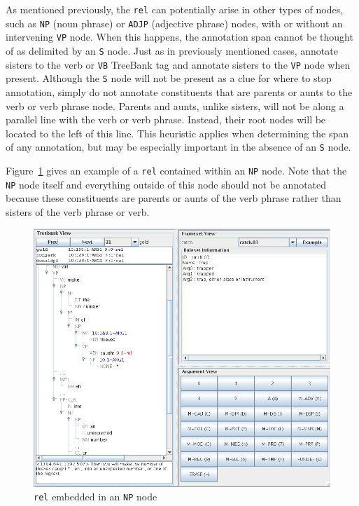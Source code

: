 \documentclass[11pt]{report}
\begin{document}
As mentioned previously, the \texttt{rel} can potentially arise in other types of nodes, such as \texttt{NP} (noun phrase) or \texttt{ADJP} (adjective phrase) nodes, with or without an intervening \texttt{VP} node.  When this happens, the annotation span cannot be thought of as delimited by an \texttt{S} node.  Just as in previously mentioned cases, annotate sisters to the verb or \texttt{VB} TreeBank tag and annotate sisters to the \texttt{VP} node when present.  Although the \texttt{S} node will not be present as a clue for where to stop annotation, simply do not annotate constituents that are parents or aunts to the verb or verb phrase node.  Parents and aunts, unlike sisters, will not be along a parallel line with the verb or verb phrase.  Instead, their root nodes will be located to the left of this line.  This heuristic applies when determining the span of any annotation, but may be especially important in the absence of an \texttt{S} node.  

Figure~\ref{fig: NPRel} gives an example of a \texttt{rel} contained within an \texttt{NP} node.  Note that the \texttt{NP} node itself and everything outside of this node should not be annotated because these constituents are parents or aunts of the verb phrase rather than sisters of the verb phrase or verb. 

\begin{figure}[htbp]
\centering
\includegraphics[scale=0.4]{img/NPRel.png}
\caption{\texttt{rel} embedded in an \texttt{NP} node}
\label{fig: NPRel}
\end{figure}
\end{document}
